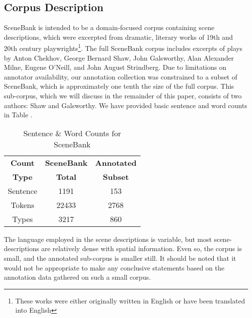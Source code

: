 \documentclass[11pt]{article}
\begin{document}
\subsection{Corpus Description} %
\label{sub:corpus_description}
SceneBank is intended to be a domain-focused corpus containing scene descriptions, which were excerpted from dramatic, literary works of 19th and 20th century playwrights\footnote{These works were either originally written in English or have been translated into English}. The full SceneBank corpus includes excerpts of plays by Anton Chekhov, George Bernard Shaw, John Galsworthy, Alan Alexander Milne, Eugene O'Neill, and John August Strindberg. Due to limitations on annotator availability, our annotation collection was constrained to a subset of SceneBank, which is approximately one tenth the size of the full corpus. This sub-corpus, which we will discuss in the remainder of this paper, consists of two authors: Shaw and Galsworthy. We have provided basic sentence and word counts in Table .

\begin{table}[h]
\begin{center}
\begin{tabular}
    {|c|c|c|}
    \hline \textbf{Count} & \textbf{SceneBank} & \textbf{Annotated}      \\
           \textbf{Type}  & \textbf{Total}     & \textbf{Subset}         \\
    \hline Sentence       & 1191               & 153                     \\
    \hline Tokens         & 22433              & 2768                    \\
    \hline Types          & 3217               & 860                     \\
    \hline
\end{tabular}
\caption{Sentence \& Word Counts for SceneBank}
\label{tab:sent-word-counts}
\end{center}
\end{table}

The language employed in the scene descriptions is variable, but most scene-descriptions are relatively dense with spatial information. Even so, the corpus is small, and the annotated sub-corpus is smaller still. It should be noted that it would not be appropriate to make any conclusive statements based on the annotation data gathered on such a small corpus.

\end{document}
